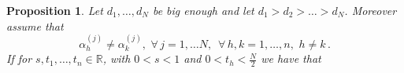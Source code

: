\documentclass[10 pt,a4paper]{article}
\theoremstyle{plain}
\newtheorem{prop}[thm]{Proposition}
\newtheorem{lem}[thm]{Lemma}
\theoremstyle{definition}
\theoremstyle{named}
\DeclareMathOperator{\Ind}{Ind}
\begin{document}
\begin{appendices}

\begin{prop}\label{max_rank}
Let  $d_1,\ldots, d_N$ be big enough and let  $d_1> d_2>\ldots>d_N$. Moreover assume that 
\begin{equation*}
 \alpha^{(j)}_{h}\neq \alpha^{(j)}_{k},\,\, \forall\, j=1,\dots N,\,\,\, \forall\, h,k=1,\dots , n,\,\, h\neq k\,.
 \end{equation*}
If for $s, t_1,\dots, t_n\in\mathbb R$, with $0<s<1$ and $0< t_h<\frac{N}{2}$ 
 we have that
\begin{equation}\label{dyson_cond}

\end{equation}
\end{prop}
\end{appendices}
\end{document}
